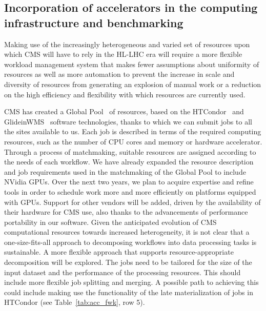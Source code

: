 \documentclass{cmspaper}
\begin{document}
\subsection{Incorporation of accelerators in the computing infrastructure and benchmarking}

Making use of the increasingly heterogeneous and varied set of resources upon which CMS will have to rely in the HL-LHC era will require a more flexible workload management system that makes fewer assumptions about uniformity of resources as well as more automation to prevent the increase in scale and diversity of resources from generating an explosion of manual work or a reduction on the high efficiency and flexibility with which resources are currently used. 

CMS has created a Global Pool~\cite{Bockelman:2019leu} of resources, based on the HTCondor~\cite{condor-practice} and GlideinWMS~\cite{Sfiligoi:2010zz} software technologies, thanks to which we can submit jobs to all the sites available to us. Each job is described in terms of the required computing resources, such as the number of CPU cores and memory or hardware accelerator. Through a process of matchmaking, suitable resources are assigned according to the needs of each workflow. We have already expanded the resource description and job requirements used in the matchmaking of the Global Pool to include NVidia GPUs.
Over the next two years, we plan to acquire expertise and refine tools in order to schedule work more and more efficiently on platforms equipped with GPUs. Support for other vendors will be added, driven by the availability of their hardware for CMS use, also thanks to the advancements of performance portability in our software.
Given the anticipated evolution of CMS computational resources towards increased heterogeneity, it is not clear that a one-size-fits-all approach to decomposing workflows into data processing tasks is sustainable. A more flexible approach that supports resource-appropriate decomposition will be explored. The jobs need to be tailored for the size of the input dataset and the performance of the processing resources. This should include more flexible job splitting and merging. A possible path to achieving this could include making use the functionality of the late materialization of jobs in HTCondor (see Table~\ref{tab:acc_fwk}, row 5).
\end{document}
